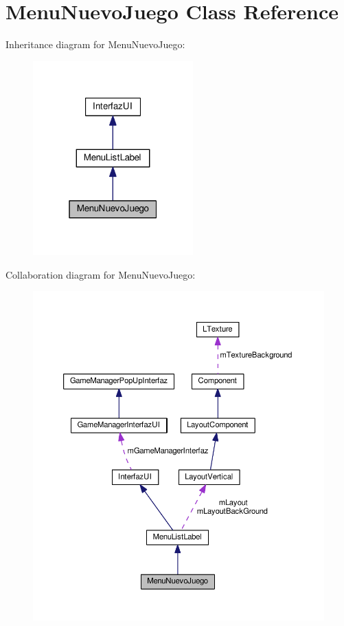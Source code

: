\hypertarget{class_menu_nuevo_juego}{}\section{Menu\+Nuevo\+Juego Class Reference}
\label{class_menu_nuevo_juego}


Inheritance diagram for Menu\+Nuevo\+Juego\+:\nopagebreak
\begin{figure}[H]
\begin{center}
\leavevmode
\includegraphics[width=175pt]{class_menu_nuevo_juego__inherit__graph}
\end{center}
\end{figure}


Collaboration diagram for Menu\+Nuevo\+Juego\+:
\nopagebreak
\begin{figure}[H]
\begin{center}
\leavevmode
\includegraphics[width=350pt]{class_menu_nuevo_juego__coll__graph}
\end{center}
\end{figure}
